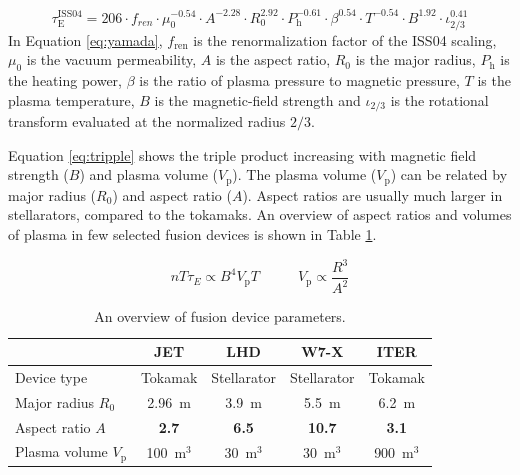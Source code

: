 \documentclass[a4paper]{article}
\begin{document}
\begin{equation}
  \tau_\mathrm{E}^{\mathrm{ISS04}}=206 \cdot f_{ren} \cdot \mu_0^{-0.54} \cdot A^{-2.28} \cdot R_0^{2.92} \cdot P_\mathrm{h}^{-0.61} \cdot \beta^{0.54} \cdot T^{-0.54} \cdot B^{1.92} \cdot \iota_{2/3}^{0.41}
  \label{eq:yamada}
\end{equation}
In Equation \ref{eq:yamada}, $f_{\mathrm{ren}}$ is the renormalization factor of the ISS04 scaling, $\mu_0$ is the vacuum permeability, $A$ is the aspect ratio, $R_0$ is the major radius, $P_\mathrm{h}$ is the heating power, $\beta$ is the ratio of plasma pressure to magnetic pressure, $T$ is the plasma temperature, $B$ is the magnetic-field strength and $\iota_{2/3}$ is the rotational transform evaluated at the normalized radius $2/3$.

\noindent Equation \ref{eq:tripple} shows the triple product increasing with magnetic field strength ($B$) and plasma volume ($V_\mathrm{p}$).
The plasma volume ($V_\mathrm{p}$) can be related by major radius ($R_0$) and aspect ratio ($A$). 
Aspect ratios are usually much larger in stellarators, compared to the tokamaks. 
An overview of aspect ratios and volumes of plasma in few selected fusion devices is shown in Table \ref{table:aspect_ratio}.

\begin{equation}
  n T \tau_E \propto  B^4 V_\mathrm{p} T \; \; \; \; \; \; \; \; \; \;  V_\mathrm{p} \propto  \dfrac{R^3}{A^2}
  \label{eq:tripple}
\end{equation}


\begin{center}
  \begin{table}[ht!]
    \centering
  \begin{tabular}{|l|c|c|c|c|}
  \hline
   & JET & LHD & W7-X & ITER \\
  \hline
  Device type & Tokamak & Stellarator & Stellarator & Tokamak \\
  \hline
  Major radius $R_0$ & 2.96~m & 3.9~m & 5.5~m & 6.2~m \\
  \hline
  Aspect ratio $A$ & \textbf{2.7} & \textbf{6.5} & \textbf{10.7} & \textbf{3.1} \\
  \hline
  Plasma volume $V_\mathrm{p}$ & 100~m$^3$ & 30~m$^3$ & 30~m$^3$ & 900~m$^3$ \\
  \hline
  \end{tabular} 
  \caption{An overview of fusion device parameters.}
  \label{table:aspect_ratio}
\end{table}

\end{center}
\end{document}
